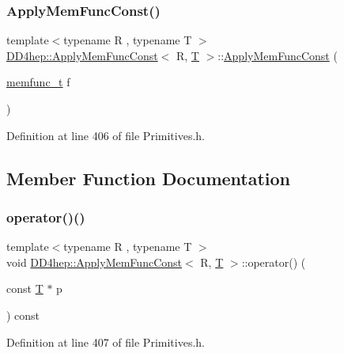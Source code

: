 \subsubsection{\texorpdfstring{Apply\+Mem\+Func\+Const()}{ApplyMemFuncConst()}}
{\footnotesize\ttfamily template$<$typename R , typename T $>$ \\
\hyperlink{struct_d_d4hep_1_1_apply_mem_func_const}{D\+D4hep\+::\+Apply\+Mem\+Func\+Const}$<$ R, \hyperlink{class_t}{T} $>$\+::\hyperlink{struct_d_d4hep_1_1_apply_mem_func_const}{Apply\+Mem\+Func\+Const} (\begin{DoxyParamCaption}\item[{\hyperlink{struct_d_d4hep_1_1_apply_mem_func_const_a0baa998fbf89b0c25d9de76bbd9a95e7}{memfunc\+\_\+t}}]{f }\end{DoxyParamCaption})\hspace{0.3cm}{\ttfamily [inline]}}



Definition at line 406 of file Primitives.\+h.



\subsection{Member Function Documentation}
\hypertarget{struct_d_d4hep_1_1_apply_mem_func_const_a9c658da0085c5cc83f4899e0d5518cf5}{}\label{struct_d_d4hep_1_1_apply_mem_func_const_a9c658da0085c5cc83f4899e0d5518cf5} 
\subsubsection{\texorpdfstring{operator()()}{operator()()}}
{\footnotesize\ttfamily template$<$typename R , typename T $>$ \\
void \hyperlink{struct_d_d4hep_1_1_apply_mem_func_const}{D\+D4hep\+::\+Apply\+Mem\+Func\+Const}$<$ R, \hyperlink{class_t}{T} $>$\+::operator() (\begin{DoxyParamCaption}\item[{const \hyperlink{class_t}{T} $\ast$}]{p }\end{DoxyParamCaption}) const\hspace{0.3cm}{\ttfamily [inline]}}



Definition at line 407 of file Primitives.\+h.



